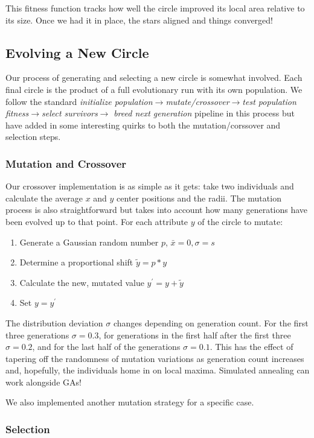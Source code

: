 \documentclass[12pt]{article}
\begin{document}
This fitness function tracks how well the circle improved its local area relative to its size. Once we had it in place, the stars aligned and things converged!

\subsection{Evolving a New Circle}
Our process of generating and selecting a new circle is somewhat involved. Each final circle is the product of a full evolutionary run with its own population. We follow the standard \textit{initialize population}$\rightarrow$\textit{mutate/crossover}$\rightarrow$\textit{test population fitness}$\rightarrow$\textit{select survivors}$\rightarrow$
\textit{breed next generation} pipeline in this process but have added in some interesting quirks to both the mutation/corssover and selection steps. 

\subsubsection{Mutation and Crossover}
Our crossover implementation is as simple as it gets: take two individuals and calculate the average $x$ and $y$ center positions and the radii. The mutation process is also straightforward but takes into account how many generations have been evolved up to that point. For each attribute $y$ of the circle to mutate:
\begin{enumerate}
\item Generate a Gaussian random number $p$, $\bar{x} = 0, \sigma = s$
\item Determine a proportional shift $\tilde{y} = p*y$
\item Calculate the new, mutated value $y^{\prime} = y + \tilde{y}$
\item Set $y = y^{\prime}$ 
\end{enumerate}
The distribution deviation $\sigma$ changes depending on generation count. For the first three generations $\sigma = 0.3$, for generations in the first half after the first three $\sigma = 0.2$, and for the last half of the generations $\sigma = 0.1$. This has the effect of tapering off the randomness of mutation variations as generation count increases and, hopefully, the individuals home in on local maxima. Simulated annealing can work alongside GAs!

We also implemented another mutation strategy for a specific case. 

\subsubsection{Selection}
\end{document}
